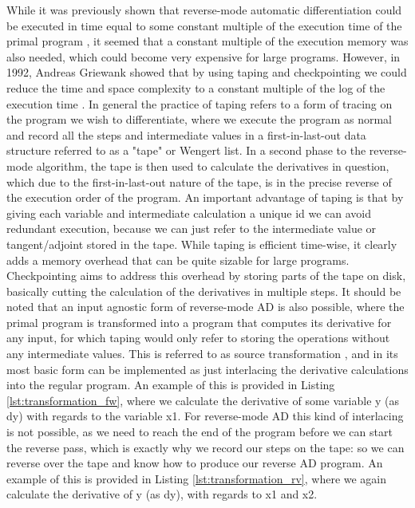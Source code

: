         While it was previously shown that reverse-mode automatic differentiation could be executed in time equal to some constant multiple of the execution time of the primal program \cite{linnainmaa1976taylor}, it seemed that a constant multiple of the execution memory was also needed, which could become very expensive for large programs.
        However, in 1992, Andreas Griewank showed that by using taping and checkpointing we could reduce the time and space complexity to a constant multiple of the log of the execution time \cite{griewank1992achieving}.
        In general the practice of taping refers to a form of tracing on the program we wish to differentiate, where we execute the program as normal and record all the steps and intermediate values in a first-in-last-out data structure referred to as a "tape" or Wengert list.
        In a second phase to the reverse-mode algorithm, the tape is then used to calculate the derivatives in question, which due to the first-in-last-out nature of the tape, is in the precise reverse of the execution order of the program.
        An important advantage of taping is that by giving each variable and intermediate calculation a unique id we can avoid redundant execution, because we can just refer to the intermediate value or tangent/adjoint stored in the tape.
        While taping is efficient time-wise, it clearly adds a memory overhead that can be quite sizable for large programs.
        Checkpointing aims to address this overhead by storing parts of the tape on disk, basically cutting the calculation of the derivatives in multiple steps.
        It should be noted that an input agnostic form of reverse-mode AD is also possible, where the primal program is transformed into a program that computes its derivative for any input, for which taping would only refer to storing the operations without any intermediate values.
        This is referred to as source transformation \cite{bischof2000computing}, and in its most basic form can be implemented as just interlacing the derivative calculations into the regular program.
        An example of this is provided in Listing \ref{lst:transformation_fw}, where we calculate the derivative of some variable y (as dy) with regards to the variable x1.
        For reverse-mode AD this kind of interlacing is not possible, as we need to reach the end of the program before we can start the reverse pass, which is exactly why we record our steps on the tape: so we can reverse over the tape and know how to produce our reverse AD program.
        An example of this is provided in Listing \ref{lst:transformation_rv}, where we again calculate the derivative of y (as dy), with regards to x1 and x2.

